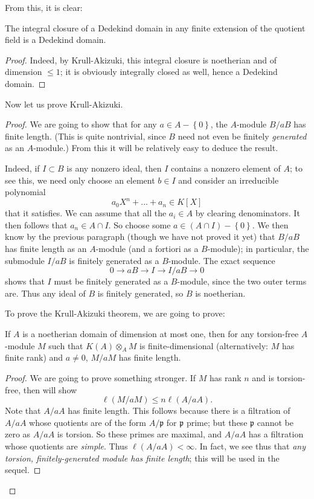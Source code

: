 From this, it is clear:

\begin{theorem} 
The integral closure of a Dedekind domain in any finite extension of the
quotient field is a Dedekind domain.
\end{theorem} 
\begin{proof} 
Indeed, by Krull-Akizuki, this integral closure is noetherian and of dimension
$\leq 1$; it is obviously integrally closed as well, hence a Dedekind domain.
\end{proof} 

Now let us prove Krull-Akizuki.
\begin{proof} 
We are going to show that for any $a \in A - \left\{0\right\}$, the $A$-module
$B/a B$ has finite length. (This is quite nontrivial, since $B$ need not even
be finitely \emph{generated} as an $A$-module.) 
From this it will be relatively easy to deduce the result.

Indeed, if $I \subset B$ is any nonzero ideal, then $I$ contains a nonzero  element of $A$; to
see this, we need only choose an element $b \in I$ and consider an irreducible polynomial
\[ a_0 X^n + \dots + a_n  \in K[X]  \]
that it satisfies. We can assume that all the $a_i \in A$ by clearing
denominators. It then follows that $a_n \in A \cap I$. 
So choose some $a \in (A \cap I) - \left\{0\right\}$. 
We then know by the previous paragraph (though we have not proved it yet) that
$B/aB$ has finite length as an $A$-module (and a fortiori as a $B$-module); in
particular, the submodule $I/aB$ is finitely generated as a
$B$-module. The
exact sequence
\[ 0 \to a B \to I \to I/aB \to 0  \]
shows that $I$ must be finitely generated as a $B$-module, since the two outer
terms are.
Thus any ideal of $B$ is finitely generated, so $B$ is noetherian.


To prove the Krull-Akizuki theorem, we are going to prove:
\begin{lemma}
If $A$ is a noetherian domain of dimension at most one, then for any
torsion-free
$A$-module $M$ such that $K(A) \otimes_A M$ is finite-dimensional
(alternatively: $M$ has finite rank) and $a \neq 0$, $M/aM$ has finite length.
\end{lemma} 
\begin{proof} 
We are going to prove something stronger. If $M$ has rank $n$ and is
torsion-free, then will show
\begin{equation} \label{boundka} \ell(M/aM) \leq n \ell(A/aA).   \end{equation}
Note that $A/aA$ has finite length. This follows because there is a filtration of
$A/aA$ whose quotients are of the form $A/\mathfrak{p}$ for $\mathfrak{p}$
prime; but these $\mathfrak{p}$ cannot be zero as $A/aA$ is torsion. So these
primes are maximal, and $A/aA$ has a filtration whose quotients are
\emph{simple}. Thus $\ell(A/aA) < \infty$. In fact, we see thus that \emph{any
torsion, finitely-generated module has finite length}; this will be used in
the sequel.



\end{proof}
\end{proof}
